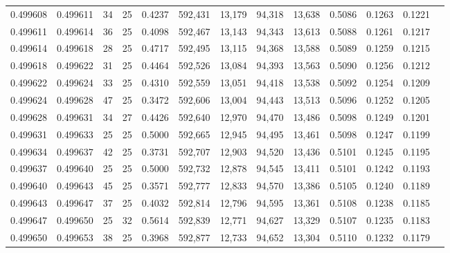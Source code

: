 \begin{tabular}{rrrrrrrrrrrrr}
0.499608 & 0.499611 &    34 &  25 &                                     0.4237 & 592,431 &  13,179 &  94,318 &  13,638 & 0.5086 & 0.1263 & 0.1221 \\
0.499611 & 0.499614 &    36 &  25 &                                     0.4098 & 592,467 &  13,143 &  94,343 &  13,613 & 0.5088 & 0.1261 & 0.1217 \\
0.499614 & 0.499618 &    28 &  25 &                                     0.4717 & 592,495 &  13,115 &  94,368 &  13,588 & 0.5089 & 0.1259 & 0.1215 \\
0.499618 & 0.499622 &    31 &  25 &                                     0.4464 & 592,526 &  13,084 &  94,393 &  13,563 & 0.5090 & 0.1256 & 0.1212 \\
0.499622 & 0.499624 &    33 &  25 &                                     0.4310 & 592,559 &  13,051 &  94,418 &  13,538 & 0.5092 & 0.1254 & 0.1209 \\
0.499624 & 0.499628 &    47 &  25 &                                     0.3472 & 592,606 &  13,004 &  94,443 &  13,513 & 0.5096 & 0.1252 & 0.1205 \\
0.499628 & 0.499631 &    34 &  27 &                                     0.4426 & 592,640 &  12,970 &  94,470 &  13,486 & 0.5098 & 0.1249 & 0.1201 \\
0.499631 & 0.499633 &    25 &  25 &                                     0.5000 & 592,665 &  12,945 &  94,495 &  13,461 & 0.5098 & 0.1247 & 0.1199 \\
0.499634 & 0.499637 &    42 &  25 &                                     0.3731 & 592,707 &  12,903 &  94,520 &  13,436 & 0.5101 & 0.1245 & 0.1195 \\
0.499637 & 0.499640 &    25 &  25 &                                     0.5000 & 592,732 &  12,878 &  94,545 &  13,411 & 0.5101 & 0.1242 & 0.1193 \\
0.499640 & 0.499643 &    45 &  25 &                                     0.3571 & 592,777 &  12,833 &  94,570 &  13,386 & 0.5105 & 0.1240 & 0.1189 \\
0.499643 & 0.499647 &    37 &  25 &                                     0.4032 & 592,814 &  12,796 &  94,595 &  13,361 & 0.5108 & 0.1238 & 0.1185 \\
0.499647 & 0.499650 &    25 &  32 &                                     0.5614 & 592,839 &  12,771 &  94,627 &  13,329 & 0.5107 & 0.1235 & 0.1183 \\
0.499650 & 0.499653 &    38 &  25 &                                     0.3968 & 592,877 &  12,733 &  94,652 &  13,304 & 0.5110 & 0.1232 & 0.1179 \\

\end{tabular}

